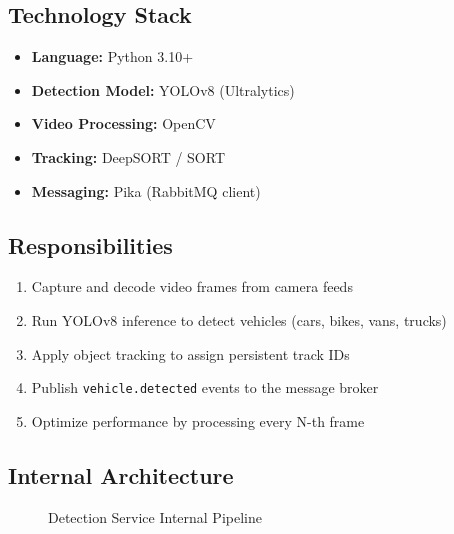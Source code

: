 \documentclass[12pt,a4paper]{report}
\begin{document}
\subsection{Technology Stack}
\begin{itemize}
    \item \textbf{Language:} Python 3.10+
    \item \textbf{Detection Model:} YOLOv8 (Ultralytics)
    \item \textbf{Video Processing:} OpenCV
    \item \textbf{Tracking:} DeepSORT / SORT
    \item \textbf{Messaging:} Pika (RabbitMQ client)
\end{itemize}

\subsection{Responsibilities}
\begin{enumerate}
    \item Capture and decode video frames from camera feeds
    \item Run YOLOv8 inference to detect vehicles (cars, bikes, vans, trucks)
    \item Apply object tracking to assign persistent track IDs
    \item Publish \texttt{vehicle.detected} events to the message broker
    \item Optimize performance by processing every N-th frame
\end{enumerate}

\subsection{Internal Architecture}
\begin{figure}[H]
\centering
{}
\caption{Detection Service Internal Pipeline}
\label{fig:detection_pipeline}
\end{figure}
\end{document}
